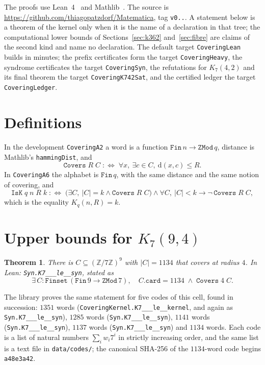 \documentclass[11pt]{amsart}
\newtheorem{theorem}{Theorem}
\theoremstyle{definition}
\theoremstyle{remark}
\begin{document}
The proofs use Lean~4~\cite{lean4} and Mathlib~\cite{mathlib}. The source is \url{https://github.com/thiagopatzdorf/Matematica}, tag \texttt{v0..}.
A statement below is a theorem of the kernel only when it is the name of a declaration in that tree; the computational lower bounds of Sections~\ref{sec:k362} and~\ref{sec:fibre} are claims of the second kind and name no declaration.
The default target \texttt{CoveringLean} builds in minutes; the prefix certificates form the target \texttt{CoveringHeavy}, the syndrome certificates the target \texttt{CoveringSyn}, the refutations for $K_7(4,2)$ and its final theorem the target \texttt{CoveringK742Sat}, and the certified ledger the target \texttt{CoveringLedger}.

\section{Definitions}
In the development \texttt{CoveringA2} a word is a function $\mathtt{Fin}\,n\to\mathtt{ZMod}\,q$, distance is Mathlib's \texttt{hammingDist}, and
\[
  \texttt{Covers}\;R\;C \;:\iff\; \forall x,\ \exists c\in C,\ \mathrm{d}(x,c)\le R .
\]
In \texttt{CoveringA6} the alphabet is $\mathtt{Fin}\,q$, with the same distance and the same notion of covering, and
\[
  \texttt{IsK}\;q\;n\;R\;k \;:\iff\; \bigl(\exists C,\ |C|=k \wedge \texttt{Covers}\;R\;C\bigr) \wedge \forall C,\ |C|<k \to \neg\,\texttt{Covers}\;R\;C ,
\]
which is the equality $K_q(n,R)=k$.

\section{Upper bounds for $K_7(9,4)$}\label{sec:k794}

\begin{theorem}\label{thm:k794}
There is $C\subseteq(\mathbb{Z}/7\mathbb{Z})^9$ with $|C|=1134$ that covers at radius $4$.
In Lean: \texttt{Syn.\allowbreak K7\_\_\_\allowbreak le\_\_\allowbreak syn}, stated as
\[
  \exists\, C : \mathtt{Finset}\,(\mathtt{Fin}\,9\to\mathtt{ZMod}\,7),\quad C.\mathtt{card}=1134 \;\wedge\; \texttt{Covers}\;4\;C .
\]
\end{theorem}

The library proves the same statement for five codes of this cell, found in succession: $1351$ words (\texttt{CoveringKernel.\allowbreak K7\_\_\_\allowbreak le\_\_\allowbreak kernel}, and again as \texttt{Syn.\allowbreak K7\_\_\_\allowbreak le\_\_\allowbreak syn}), $1285$ words (\texttt{Syn.\allowbreak K7\_\_\_\allowbreak le\_\_\allowbreak syn}), $1141$ words (\texttt{Syn.\allowbreak K7\_\_\_\allowbreak le\_\_\allowbreak syn}), $1137$ words (\texttt{Syn.\allowbreak K7\_\_\_\allowbreak le\_\_\allowbreak syn}) and $1134$ words.
Each code is a list of natural numbers $\sum_i w_i 7^i$ in strictly increasing order, and the same list is a text file in \texttt{data/\allowbreak codes/}; the canonical SHA-256 of the $1134$-word code begins \texttt{a48e3a42}.
\end{document}
